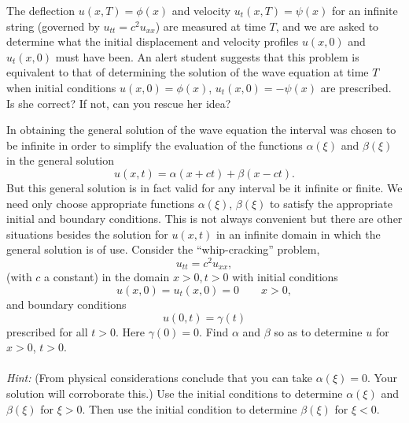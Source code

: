 {%
\begin{Exercise}
  The deflection $u(x,T) = \phi(x)$ and 
  velocity $u_t(x,T) = \psi(x)$ for an infinite string (governed by
  $u_{tt} = c^2u_{xx}$) are measured at time $T$, and we are asked to determine
  what the initial displacement and velocity profiles $u(x,0)$ and
  $u_t(x,0)$ must have been. An alert student suggests that this problem is
  equivalent to that of determining the solution of the wave equation
  at time $T$ when initial conditions $u(x,0) = \phi(x)$, $u_t(x,0) = 
  -\psi(x)$ are prescribed. Is she correct? If not, can you rescue her idea?
\end{Exercise}




\begin{Exercise}
  In obtaining the general solution of the
  wave equation the interval was chosen to be infinite in order to simplify
  the evaluation of the functions $\alpha(\xi)$ and $\beta(\xi)$ in the 
  general solution
  \[
  u(x,t) = \alpha(x+ct) + \beta(x-ct).  
  \]
  But this general solution is in fact valid for any interval be it infinite
  or finite. We need only choose appropriate functions
  $\alpha(\xi)$, $\beta(\xi)$ to satisfy the appropriate initial and
  boundary conditions. This is not 
  always convenient but there are other situations besides the solution
  for $u(x,t)$ in an infinite domain in which the general solution is of use.
  Consider the ``whip-cracking'' problem,
  \[
  u_{tt} = c^2 u_{xx},  
  \]
  (with $c$ a constant) in the domain $x>0, t> 0$ with initial conditions
  \[
  u(x,0) = u_t(x,0) = 0 \qquad x>0,
  \]
  and boundary conditions
  \[
  u(0,t) = \gamma(t)
  \]
  prescribed for all $t> 0$. Here $\gamma(0) = 0$. Find $\alpha$ and $\beta$
  so as to determine $u$ for $x > 0$, $ t > 0.$ \\ \\
  \textit{Hint: } 
  (From physical considerations conclude that you can take $\alpha(\xi) = 0$.
  Your solution will corroborate this.)
  Use the initial conditions to determine 
  $\alpha(\xi)$ and $\beta(\xi)$ for $\xi > 0$.  Then use the initial
  condition to determine $\beta(\xi)$ for $\xi < 0$.
\end{Exercise}







}
